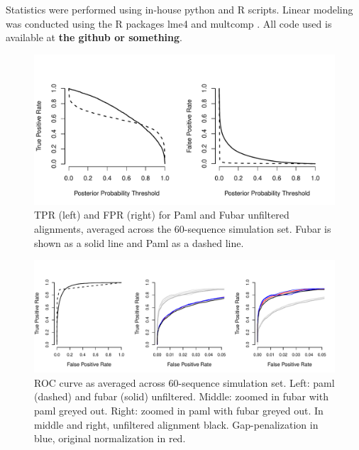 \documentclass[10pt]{article}
\begin{document}
Statistics were performed using in-house python and R scripts. Linear modeling was conducted using the R packages lme4 \citep{Bates2012} and
multcomp \citep{Hothorn2008}. All code used is available at \textbf{the github or something}.



\begin{figure}[H]
\label{tprfpr}
\centerline{\includegraphics[width=5in]{Figures/tprfpr.pdf}}
\caption{TPR (left) and FPR (right) for Paml and Fubar unfiltered alignments, averaged across the 60-sequence simulation set. Fubar is shown as a solid line and Paml as a dashed line.}
\end{figure}

\begin{figure}[H]
\label{roc}
\centerline{\includegraphics[width=7in]{Figures/roc.pdf}}
\caption{ROC curve as averaged across 60-sequence simulation set. Left: paml (dashed) and fubar (solid) unfiltered. Middle: zoomed in fubar with paml greyed out. Right: zoomed in paml with fubar greyed out. In middle and right, unfiltered alignment black. Gap-penalization in blue, original normalization in red.}
\end{figure}
\end{document}
